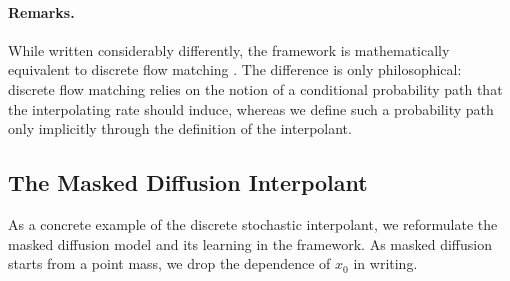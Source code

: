 \paragraph{Remarks.} While written considerably differently, the framework is mathematically equivalent to discrete flow matching \cite{gat2024discrete}. The difference is only philosophical: discrete flow matching relies on the notion of a conditional probability path that the interpolating rate should induce, whereas we define such a probability path only implicitly through the definition of the interpolant.

\subsection{The Masked Diffusion Interpolant} \label{sec:masked-diffusion-interpolant}
As a concrete example of the discrete stochastic interpolant, we reformulate the masked diffusion model and its learning in the framework. As masked diffusion starts from a point mass, we drop the dependence of $x_0$ in writing.

